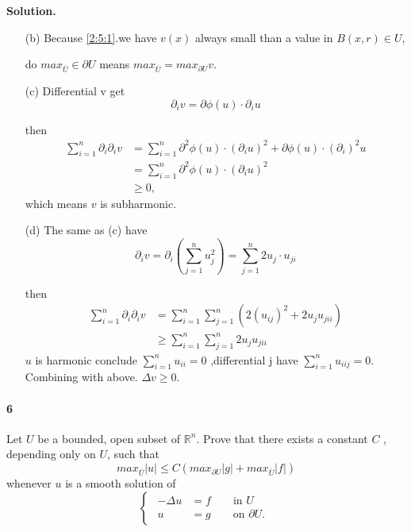 \message{ !name(21935004-\unexpanded{谭焱}-homework2.tex)}\documentclass[a4paper]{book}
\newenvironment{solution}%
{\noindent\textbf{Solution.}}%
{\qedhere}
\numberwithin{equation}{chapter}
\theoremstyle{definition}
\begin{document}
\begin{multicols}{2}
\begin{solution}
\begin{itemize}
		\item[(b)] Because \ref{2:5:1}.we have $v(x)$ always small than a value in $B(x,r) \in U$,
		
		do $max_{\bar{U}} \in \partial U$ means $max_{\bar{U}} = max_{\partial U} v. $
		
		\item[(c)] Differential v get
		$$ \partial_i v = \partial \phi(u) \cdot \partial_i u $$
		
		then 
		\begin{equation}
			\begin{aligned}
			\sum_{i = 1}^{n} \partial_i \partial_i v &=\sum_{i = 1}^{n} \partial^2 \phi(u) \cdot (\partial_i u)^2 + \partial \phi(u) \cdot (\partial_i)^2 u \\
			&=\sum_{i = 1}^{n} \partial^2 \phi(u) \cdot (\partial_i u)^2 \\ 
			&\geq 0 ,
			\end{aligned}
		\end{equation}
		which means $v$ is subharmonic.
		
		\item[(d)]The same as (c) have
		\[ \partial_i v = \partial_i(\sum_{j = 1}^{n} u_j^2) = \sum_{j = 1}^{n} 2u_j \cdot u_{ji} \]
		
		then 
		\begin{equation}
			\begin{aligned}
				\sum_{i = 1}^{n} \partial_i \partial_i v &= \sum_{i = 1}^n \sum_{j = 1}^n(2(u_{ij})^2 + 2u_ju_{jii}) \\
				&\geq \sum_{i = 1}^n \sum_{j = 1}^n 2u_j u_{jii}
			\end{aligned}
		\end{equation}
		$u$ is harmonic conclude $ \sum_{i = 1}^{n} u_{ii} = 0 $ ,differential j have $ \sum_{i = 1}^{n} u_{iij} = 0 $. Combining with above. $\Delta v \geq 0$.
	\end{itemize}
\end{solution}


\paragraph{6}
Let $U$ be a bounded, open subset of $\mathbb{R}^n$. Prove that there exists a constant $C$ , depending only on $U$, such that 
\begin{equation}\label{2:6:1}
	max_{\bar{U}} |u| \leq C(max_{\partial U} |g| + max_{\bar{U}} |f|)
\end{equation}
whenever $u$ is a smooth solution of 
\begin{equation}\label{2:6:2}
	\begin{cases}
	\begin{aligned}
	-\Delta u &= f \qquad \text{in } U\\
	u &= g \qquad \text{on } \partial U.
	\end{aligned}
	\end{cases}
\end{equation}


\end{multicols}
\end{document}
